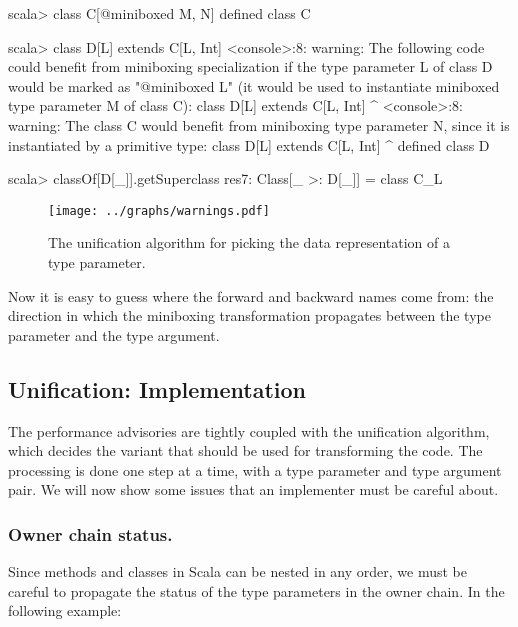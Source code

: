 \begin{lstlisting-nobreak-nolang}
scala> class C[@miniboxed M, N]
defined class C

scala> class D[L] extends C[L, Int]
<console>:8: warning: The following code could benefit from miniboxing specialization if the type parameter L of class D would be marked as "@miniboxed L" (it would be used to instantiate miniboxed type parameter M of class C):
       class D[L] extends C[L, Int]
               ^
<console>:8: warning: The class C would benefit from miniboxing type parameter N, since it is instantiated by a primitive type:
       class D[L] extends C[L, Int]
               ^
defined class D

scala> classOf[D[_]].getSuperclass
res7: Class[_ >: D[_]] = class C_L
\end{lstlisting-nobreak-nolang}

\begin{figure}[t!]
  \vspace{0.01\textheight}
  \centering
  \texttt{[image: ../graphs/warnings.pdf]}
  \caption{The unification algorithm for picking the data representation of a type parameter.}
  \label{fig:algorithm}
\end{figure}

Now it is easy to guess where the forward and backward names come from: the direction in which the miniboxing transformation propagates between the type parameter and the type argument.

\vspace{-0.25em}

\subsection{Unification: Implementation}

\vspace{-0.5em}

The performance advisories are tightly coupled with the unification algorithm, which decides the variant that should be used for transforming the code. The processing is done one step at a time, with a type parameter and type argument pair. We will now show some issues that an implementer must be careful about.

\vspace{-0.5em}

\subsubsection{Owner chain status.} Since methods and classes in Scala can be nested in any order, we must be careful to propagate the status of the type parameters in the owner chain. In the following example:

